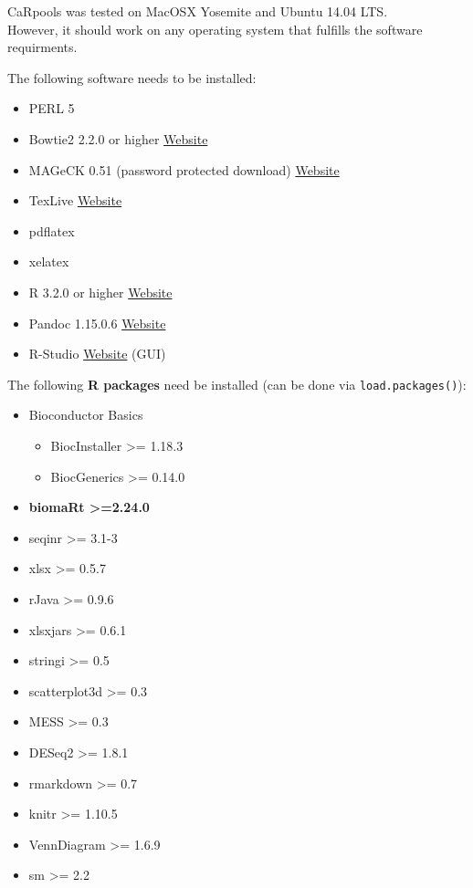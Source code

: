 \documentclass[]{article}
\providecommand{\tightlist}{%
  \setlength{\itemsep}{0pt}\setlength{\parskip}{0pt}}
\begin{document}
CaRpools was tested on MacOSX Yosemite and Ubuntu 14.04 LTS.\\
However, it should work on any operating system that fulfills the
software requirments.

The following software needs to be installed:

\begin{itemize}
\tightlist
\item
  PERL 5
\item
  Bowtie2 2.2.0 or higher
  \href{http://bowtie-bio.sourceforge.net/bowtie2/index.shtml}{Website}
\item
  MAGeCK 0.51 (password protected download)
  \href{http://sourceforge.net/p/mageck/wiki/Home/}{Website}
\item
  TexLive \href{https://www.tug.org/texlive/}{Website}
\item
  pdflatex
\item
  xelatex
\item
  R 3.2.0 or higher \href{https://www.r-project.org/}{Website}
\item
  Pandoc 1.15.0.6 \href{http://www.http://pandoc.org/}{Website}
\item
  R-Studio \href{http://www.rstudio.com}{Website} (GUI)
\end{itemize}

The following \textbf{R packages} need be installed (can be done via
\texttt{load.packages()}):

\begin{itemize}
\tightlist
\item
  Bioconductor Basics

  \begin{itemize}
  \tightlist
  \item
    BiocInstaller \textgreater{}= 1.18.3
  \item
    BiocGenerics \textgreater{}= 0.14.0
  \end{itemize}
\item
  \textbf{biomaRt \textgreater{}=2.24.0}
\item
  seqinr \textgreater{}= 3.1-3
\item
  xlsx \textgreater{}= 0.5.7
\item
  rJava \textgreater{}= 0.9.6
\item
  xlsxjars \textgreater{}= 0.6.1
\item
  stringi \textgreater{}= 0.5
\item
  scatterplot3d \textgreater{}= 0.3
\item
  MESS \textgreater{}= 0.3
\item
  DESeq2 \textgreater{}= 1.8.1
\item
  rmarkdown \textgreater{}= 0.7
\item
  knitr \textgreater{}= 1.10.5
\item
  VennDiagram \textgreater{}= 1.6.9
\item
  sm \textgreater{}= 2.2
\end{itemize}
\end{document}
